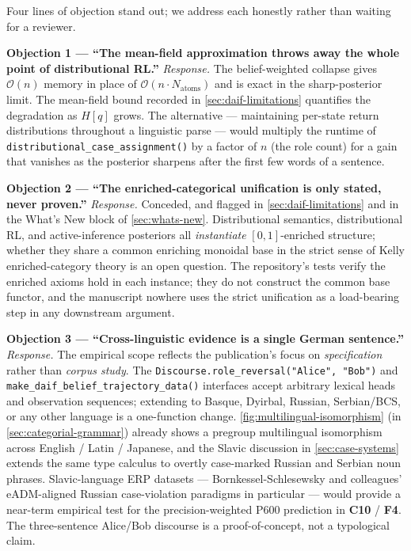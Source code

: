 \documentclass[
]{article}
\begin{document}
Four lines of objection stand out; we address each honestly rather than
waiting for a reviewer.

\textbf{Objection 1 --- ``The mean-field approximation throws away the
whole point of distributional RL.''} \emph{Response.} The
belief-weighted collapse gives \(\mathcal{O}(n)\) memory in place of
\(\mathcal{O}(n \cdot N_{\text{atoms}})\) and is exact in the
sharp-posterior limit. The mean-field bound recorded in
\autoref{sec:daif-limitations} quantifies the degradation as \(H[q]\)
grows. The alternative --- maintaining per-state return distributions
throughout a linguistic parse --- would multiply the runtime of
\texttt{distributional\_case\_assignment()} by a factor of \(n\) (the
role count) for a gain that vanishes as the posterior sharpens after the
first few words of a sentence.

\textbf{Objection 2 --- ``The enriched-categorical unification is only
stated, never proven.''} \emph{Response.} Conceded, and flagged in
\autoref{sec:daif-limitations} and in the What's New block of
\autoref{sec:whats-new}. Distributional semantics, distributional RL,
and active-inference posteriors all \emph{instantiate}
\([0,1]\)-enriched structure; whether they share a common enriching
monoidal base in the strict sense of Kelly enriched-category theory is
an open question. The repository's tests verify the enriched axioms hold
in each instance; they do not construct the common base functor, and the
manuscript nowhere uses the strict unification as a load-bearing step in
any downstream argument.

\textbf{Objection 3 --- ``Cross-linguistic evidence is a single German
sentence.''} \emph{Response.} The empirical scope reflects the
publication's focus on \emph{specification} rather than \emph{corpus
study}. The \texttt{Discourse.role\_reversal("Alice",\ "Bob")} and
\texttt{make\_daif\_belief\_trajectory\_data()} interfaces accept
arbitrary lexical heads and observation sequences; extending to Basque,
Dyirbal, Russian, Serbian/BCS, or any other language is a one-function
change. \autoref{fig:multilingual-isomorphism} (in
\autoref{sec:categorial-grammar}) already shows a pregroup multilingual
isomorphism across English / Latin / Japanese, and the Slavic discussion
in \autoref{sec:case-systems} extends the same type calculus to overtly
case-marked Russian and Serbian noun phrases. Slavic-language ERP
datasets --- Bornkessel-Schlesewsky and colleagues' eADM-aligned Russian
case-violation paradigms in particular \citep{bornkessel2006extended}
--- would provide a near-term empirical test for the precision-weighted
P600 prediction in \textbf{C10} / \textbf{F4}. The three-sentence
Alice/Bob discourse is a proof-of-concept, not a typological claim.
\end{document}
